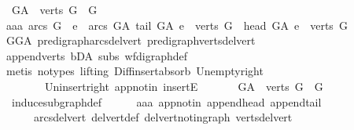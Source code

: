 \begin{isabellebody}
\ \ {\isachardoublequoteopen}G{\isacharunderscore}{\kern0pt}A\ {\isasymrestriction}\ {\isacharparenleft}{\kern0pt}verts\ G{\isacharparenright}{\kern0pt}\ {\isacharequal}{\kern0pt}\ G{\isachardoublequoteclose}\ \ \isanewline
%
\isadelimproof
%
\endisadelimproof
%
\isatagproof
{}\isamarkupfalse%
\ {\isacharminus}{\kern0pt}\isanewline
\ \ \isamarkupfalse%
\ aaa{\isacharcolon}{\kern0pt}\ {\isachardoublequoteopen}arcs\ G\ {\isacharequal}{\kern0pt}\ {\isacharbraceleft}{\kern0pt}e\ {\isasymin}\ arcs\ G{\isacharunderscore}{\kern0pt}A{\isachardot}{\kern0pt}\ tail\ G{\isacharunderscore}{\kern0pt}A\ e\ {\isasymin}\ verts\ G\ {\isasymand}\ head\ G{\isacharunderscore}{\kern0pt}A\ e\ {\isasymin}\ verts\ G{\isacharbraceright}{\kern0pt}{\isachardoublequoteclose}\isanewline
\ \ \ \ \isamarkupfalse%
\ GG{\isacharunderscore}{\kern0pt}A\ pre{\isacharunderscore}{\kern0pt}digraph{\isachardot}{\kern0pt}arcs{\isacharunderscore}{\kern0pt}del{\isacharunderscore}{\kern0pt}vert\ pre{\isacharunderscore}{\kern0pt}digraph{\isachardot}{\kern0pt}verts{\isacharunderscore}{\kern0pt}del{\isacharunderscore}{\kern0pt}vert\isanewline
\ \ \ \ \isamarkupfalse%
\ append{\isacharunderscore}{\kern0pt}verts\ bD{\isacharunderscore}{\kern0pt}A\ subs\ wf{\isacharunderscore}{\kern0pt}digraph{\isacharunderscore}{\kern0pt}def\isanewline
\ \ \ \ \isamarkupfalse%
\ {\isacharparenleft}{\kern0pt}metis\ {\isacharparenleft}{\kern0pt}no{\isacharunderscore}{\kern0pt}types{\isacharcomma}{\kern0pt}\ lifting{\isacharparenright}{\kern0pt}\ Diff{\isacharunderscore}{\kern0pt}insert{\isacharunderscore}{\kern0pt}absorb\ Un{\isacharunderscore}{\kern0pt}empty{\isacharunderscore}{\kern0pt}right\isanewline
\ \ \ \ \ \ \ \ Un{\isacharunderscore}{\kern0pt}insert{\isacharunderscore}{\kern0pt}right\ app{\isacharunderscore}{\kern0pt}notin\ insertE{\isacharparenright}{\kern0pt}\ \ \isanewline
\ \ \isamarkupfalse%
\ \ {\isachardoublequoteopen}G{\isacharunderscore}{\kern0pt}A\ {\isasymrestriction}\ verts\ G\ {\isacharequal}{\kern0pt}\ G{\isachardoublequoteclose}\ \isanewline
\ \ \ \ \isamarkupfalse%
\ \ induce{\isacharunderscore}{\kern0pt}subgraph{\isacharunderscore}{\kern0pt}def\isanewline
\ \ \ \ \isamarkupfalse%
\ aaa\ app{\isacharunderscore}{\kern0pt}notin\ append{\isacharunderscore}{\kern0pt}head\ append{\isacharunderscore}{\kern0pt}tail\ \isanewline
\ \ \ \ \ \ arcs{\isacharunderscore}{\kern0pt}del{\isacharunderscore}{\kern0pt}vert\ del{\isacharunderscore}{\kern0pt}vert{\isacharunderscore}{\kern0pt}def\ del{\isacharunderscore}{\kern0pt}vert{\isacharunderscore}{\kern0pt}not{\isacharunderscore}{\kern0pt}in{\isacharunderscore}{\kern0pt}graph\ verts{\isacharunderscore}{\kern0pt}del{\isacharunderscore}{\kern0pt}vert\isanewline

\end{isabellebody}
